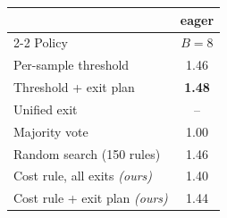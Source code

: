 \begin{tabular}{@{}lc@{}}
\toprule
 & \multicolumn{1}{c}{eager} \\
\cmidrule(lr){2-2}
Policy & $B=8$ \\
\midrule
Per-sample threshold & 1.46 \\
Threshold + exit plan & \textbf{1.48} \\
Unified exit & -- \\
Majority vote & 1.00 \\
Random search (150 rules) & 1.46 \\
\midrule
Cost rule, all exits \textit{(ours)} & 1.40 \\
Cost rule + exit plan \textit{(ours)} & 1.44 \\
\bottomrule
\end{tabular}
